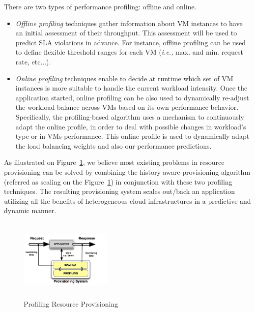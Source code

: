 \noindent There are two types of performance profiling: offline and online.

\begin{itemize}
\item \emph{Offline profiling} techniques gather information about VM instances to have an initial assessment of their throughput. This assessment will be used to predict SLA violations in advance. For instance, offline profiling can be used to define flexible threshold ranges for each VM (\emph{i.e.,} max. and min. request rate, etc...).

\item \emph{Online profiling} techniques enable to decide at runtime which set of VM instances is more suitable to handle the current workload intensity. Once the application started, online profiling can be also used to dynamically re-adjust the workload balance across VMs based on its own performance behavior. Specifically,  the profiling-based algorithm uses a mechanism to continuously adapt the online profile, in order to deal with possible changes in workload's type or in VMs performance. This online profile is used to dynamically adapt the load balancing weights and also our performance predictions. 

\end{itemize}

As illustrated on Figure~\ref{model}, we believe most existing problems in resource provisioning can be solved by combining the history-aware provisioning algorithm (referred as scaling on the Figure~\ref{model}) in conjunction with these two profiling techniques. The resulting provisioning system scales out/back an application utilizing all the benefits of heterogeneous cloud infrastructures in a predictive and dynamic manner.



\begin{figure}
\begin{center}
\includegraphics[width=0.4\textwidth, height=4cm]{./images/monitoringSchema.jpg}
\end{center}
\label{model}
\caption{Profiling Resource Provisioning}
\end{figure}
